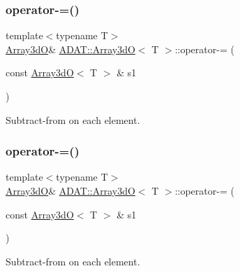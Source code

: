 \subsubsection{\texorpdfstring{operator-\/=()}{operator-=()}\hspace{0.1cm}{\footnotesize\ttfamily [2/6]}}
{\footnotesize\ttfamily template$<$typename T$>$ \\
\mbox{\hyperlink{classADAT_1_1Array3dO}{Array3dO}}\& \mbox{\hyperlink{classADAT_1_1Array3dO}{A\+D\+A\+T\+::\+Array3dO}}$<$ T $>$\+::operator-\/= (\begin{DoxyParamCaption}\item[{const \mbox{\hyperlink{classADAT_1_1Array3dO}{Array3dO}}$<$ T $>$ \&}]{s1 }\end{DoxyParamCaption})\hspace{0.3cm}{\ttfamily [inline]}}



Subtract-\/from on each element. 

\mbox{\label{classADAT_1_1Array3dO_a5c840f5014264fdee101194d22f237e0}} 
\subsubsection{\texorpdfstring{operator-\/=()}{operator-=()}\hspace{0.1cm}{\footnotesize\ttfamily [3/6]}}
{\footnotesize\ttfamily template$<$typename T$>$ \\
\mbox{\hyperlink{classADAT_1_1Array3dO}{Array3dO}}\& \mbox{\hyperlink{classADAT_1_1Array3dO}{A\+D\+A\+T\+::\+Array3dO}}$<$ T $>$\+::operator-\/= (\begin{DoxyParamCaption}\item[{const \mbox{\hyperlink{classADAT_1_1Array3dO}{Array3dO}}$<$ T $>$ \&}]{s1 }\end{DoxyParamCaption})\hspace{0.3cm}{\ttfamily [inline]}}



Subtract-\/from on each element. 

\mbox{\label{classADAT_1_1Array3dO_a0341b7ddc224910074b55646bca45e2a}} 
